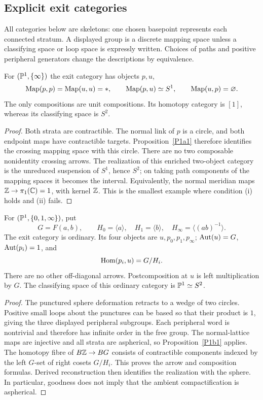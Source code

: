 \subsection{Explicit exit categories}
\label{sec:explicit-examples}

All categories below are skeletons: one chosen basepoint represents each
connected stratum. A displayed group is a discrete mapping space unless a
classifying space or loop space is expressly written. Choices of paths and
positive peripheral generators change the descriptions by equivalence.

\begin{proposition}\label{P1e1}
For $(\mathbb P^1,\{\infty\})$ the exit category has objects $p,u$,
\[
 \operatorname{Map}(p,p)=\operatorname{Map}(u,u)=*,\qquad \operatorname{Map}(p,u)\simeq S^1,
 \qquad \operatorname{Map}(u,p)=\varnothing.
\]
The only compositions are unit compositions. Its homotopy category is
$[1]$, whereas its classifying space is $S^2$.
\end{proposition}
\begin{proof}
Both strata are contractible. The normal link of $p$ is a circle, and both
endpoint maps have contractible targets. Proposition~\ref{P1a1} therefore
identifies the crossing mapping space with this circle. There are no two
composable nonidentity crossing arrows. The realization of this enriched
two-object category is the unreduced suspension of $S^1$, hence $S^2$;
on taking path components of the mapping spaces it becomes the interval.
Equivalently, the normal meridian maps $\mathbb Z\to\pi_1(\mathbb C)=1$, with kernel
$\mathbb Z$. This is the smallest example where condition (i) holds and (ii)
fails.
\end{proof}

\begin{proposition}\label{P1e2}
For $(\mathbb P^1,\{0,1,\infty\})$, put
\[
 G=F(a,b),\qquad H_0=\langle a\rangle,\quad
 H_1=\langle b\rangle,\quad H_\infty=\langle(ab)^{-1}\rangle.
\]
The exit category is ordinary. Its four objects are $u,p_0,p_1,p_\infty$;
$\operatorname{Aut}(u)=G$, $\operatorname{Aut}(p_i)=1$, and
\[
 \operatorname{Hom}(p_i,u)=G/H_i.
\]
There are no other off-diagonal arrows. Postcomposition at $u$ is left
multiplication by $G$. The classifying space of this ordinary category is
$\mathbb P^1\simeq S^2$.
\end{proposition}
\begin{proof}
The punctured sphere deformation retracts to a wedge of two circles.
Positive small loops about the punctures can be based so that their
product is $1$, giving the three displayed peripheral subgroups. Each
peripheral word is nontrivial and therefore has infinite order in the
free group. The normal-lattice maps are injective and all strata are
aspherical, so Proposition~\ref{P1b1} applies. The homotopy fibre of
$B\mathbb Z\to BG$ consists of contractible components indexed by the left
$G$-set of right cosets $G/H_i$. This proves the arrow and composition
formulas. Derived reconstruction then identifies the realization with
the sphere. In particular, goodness does not imply that the ambient
compactification is aspherical.
\end{proof}


